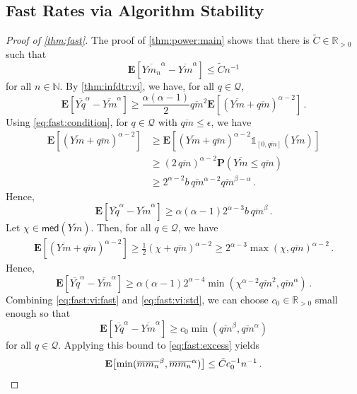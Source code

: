 \documentclass{article}
\newcommand*{\mc}[1]{\mathcal{#1}}
\newcommand{\N}{\mathbb{N}}
\newcommand{\R}{\mathbb{R}}
\newcommand{\Rpp}{\R_{>0}}
\newcommand{\lab}{\left[} %
\newcommand{\rab}{\right]} %
\newcommand{\ab}[1]{\lab #1 \rab} %
\newcommand{\abOf}[1]{\!\ab{#1}} %
\newcommand{\lb}{\left(} %
\newcommand{\rb}{\right)} %
\newcommand{\br}[1]{\lb #1 \rb} %
\newcommand{\brOf}[1]{\!\br{#1}} %
\renewcommand{\Pr}{\mathbf{P}} %
\newcommand{\PrOf}[1]{\Pr\brOf{#1}}
\newcommand{\E}{\mathbf{E}} %
\newcommand{\EOf}[1]{\E\abOf{#1}}
\newcommand{\ind}{\mathds{1}}%
\newcommand{\eqfs}{\,.}
\newcommand{\ol}[2]{\overline{#1#2}}
\newcommand{\median}{\mathsf{med}}
\begin{document}
\subsection{Fast Rates via Algorithm Stability}
%
\begin{proof}[Proof of \cref{thm:fast}]
    The proof of \cref{thm:power:main} shows that there is $\tilde C\in\Rpp$ such that
    \begin{equation}\label{eq:fast:excess}
        \EOf{\ol Y{m_n}^{\alpha}-\ol Ym^{\alpha}}
        \leq
        \tilde C n^{-1}
    \end{equation}
    for all $n\in \N$.
    By \cref{thm:infdtr:vi}, we have, for all $q\in\mc Q$,
    \begin{equation}
        \EOf{\ol Yq^\alpha-\ol Ym^\alpha} \geq \frac{\alpha(\alpha-1)}{2} \ol qm^2 \EOf{(\ol Ym + \ol qm)^{\alpha-2}}
        \eqfs
    \end{equation}
    Using \eqref{eq:fast:condition}, for $q\in \mc Q$ with $\ol qm \leq \epsilon$, we have
    \begin{align}
        \EOf{(\ol Ym + \ol qm)^{\alpha-2}} 
        &\geq 
        \EOf{(\ol Ym + \ol qm)^{\alpha-2} \ind_{[0, \ol qm]}(\ol Ym)} 
        \\&\geq 
        (2\, \ol qm)^{\alpha-2} \PrOf{\ol Ym \leq \ol qm}
        \\&\geq 
        2^{\alpha-2} b \, \ol qm^{\alpha-2} \ol qm^{\beta-\alpha}
        \eqfs
    \end{align}
    Hence,
    \begin{equation}\label{eq:fast:vi:fast}
        \EOf{\ol Yq^\alpha-\ol Ym^\alpha}
        \geq
        \alpha(\alpha-1) 2^{\alpha-3} b\, \ol qm^{\beta}
        \eqfs
    \end{equation}
    Let $\chi \in \median(\ol Ym)$.
    Then, for all $q\in \mc Q$, we have 
    \begin{align}
    	\EOf{(\ol Ym + \ol qm)^{\alpha-2}} 
    	\geq 
    	\frac12 (\chi + \ol qm)^{\alpha-2}
    	\geq 
    	2^{\alpha-3} \max(\chi, \ol qm)^{\alpha-2}
    	\eqfs
    \end{align}
    Hence,
    \begin{equation}\label{eq:fast:vi:std}
    	\EOf{\ol Yq^\alpha-\ol Ym^\alpha}
    	\geq
    	\alpha(\alpha-1) 2^{\alpha-4} \min(\chi^{\alpha-2} \ol qm^2, \ol qm^{\alpha})
    	\eqfs
    \end{equation}
    Combining \eqref{eq:fast:vi:fast} and \eqref{eq:fast:vi:std}, we can choose $c_0 \in \Rpp$ small enough so that
    \begin{equation} 
    	\EOf{\ol Yq^\alpha-\ol Ym^\alpha} \geq c_0 \min(\ol qm^{\beta}, \ol qm^{\alpha})
    \end{equation}
    for all $q\in\mc Q$.
    Applying this bound to \eqref{eq:fast:excess} yields
    \begin{equation}
    	\EOf{\min(\ol m{m_n}^{\beta}, \ol m{m_n}^{\alpha})} \leq \tilde C c_0^{-1} n^{-1}
    	\eqfs
		\qedhere
    \end{equation}
\end{proof}
%
%
\end{document}

